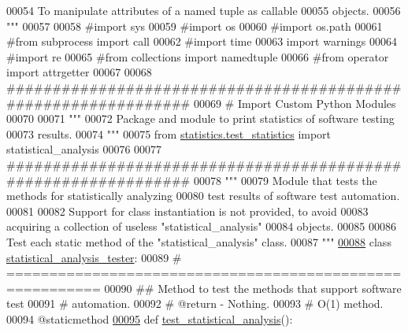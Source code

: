 \begin{DoxyCode}
00054 \textcolor{stringliteral}{                To manipulate attributes of a named tuple as callable}
00055 \textcolor{stringliteral}{                    objects.}
00056 \textcolor{stringliteral}{"""}
00057 
00058 \textcolor{comment}{#import sys}
00059 \textcolor{comment}{#import os}
00060 \textcolor{comment}{#import os.path}
00061 \textcolor{comment}{#from subprocess import call}
00062 \textcolor{comment}{#import time}
00063 \textcolor{keyword}{import} warnings
00064 \textcolor{comment}{#import re}
00065 \textcolor{comment}{#from collections import namedtuple}
00066 \textcolor{comment}{#from operator import attrgetter}
00067 
00068 \textcolor{comment}{###############################################################}
00069 \textcolor{comment}{#   Import Custom Python Modules}
00070 
00071 \textcolor{stringliteral}{"""}
00072 \textcolor{stringliteral}{    Package and module to print statistics of software testing}
00073 \textcolor{stringliteral}{        results.}
00074 \textcolor{stringliteral}{"""}
00075 \textcolor{keyword}{from} \hyperlink{namespacestatistics_1_1test__statistics}{statistics.test\_statistics} \textcolor{keyword}{import} statistical\_analysis
00076 
00077 \textcolor{comment}{###############################################################}
00078 \textcolor{stringliteral}{"""}
00079 \textcolor{stringliteral}{    Module that tests the methods for statistically analyzing}
00080 \textcolor{stringliteral}{        test results of software test automation.}
00081 \textcolor{stringliteral}{}
00082 \textcolor{stringliteral}{    Support for class instantiation is not provided, to avoid}
00083 \textcolor{stringliteral}{        acquiring a collection of useless "statistical\_analysis"}
00084 \textcolor{stringliteral}{        objects.}
00085 \textcolor{stringliteral}{}
00086 \textcolor{stringliteral}{    Test each static method of the "statistical\_analysis" class.}
00087 \textcolor{stringliteral}{"""}
\hypertarget{test__statistics__tester_8py_source_l00088}{}\hyperlink{classstatistics_1_1test__statistics__tester_1_1statistical__analysis__tester}{00088} \textcolor{keyword}{class }\hyperlink{classstatistics_1_1test__statistics__tester_1_1statistical__analysis__tester}{statistical\_analysis\_tester}:
00089     \textcolor{comment}{# =========================================================}
00090     \textcolor{comment}{##  Method to test the methods that support software test}
00091     \textcolor{comment}{#       automation.}
00092     \textcolor{comment}{#   @return - Nothing.}
00093     \textcolor{comment}{#   O(1) method.}
00094     @staticmethod
\hypertarget{test__statistics__tester_8py_source_l00095}{}\hyperlink{classstatistics_1_1test__statistics__tester_1_1statistical__analysis__tester_ad05a0d6e83aaba083bfba6212ec0b971}{00095}     \textcolor{keyword}{def }\hyperlink{classstatistics_1_1test__statistics__tester_1_1statistical__analysis__tester_ad05a0d6e83aaba083bfba6212ec0b971}{test\_statistical\_analysis}():

\end{DoxyCode}
